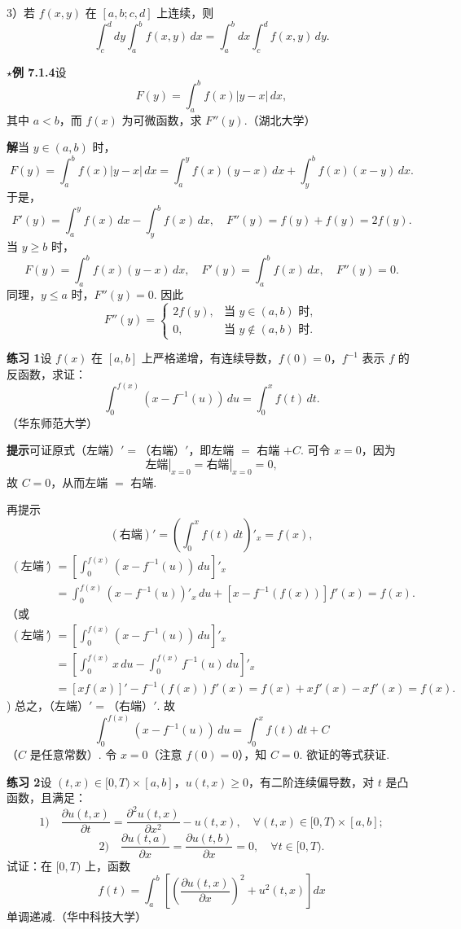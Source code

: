 \documentclass[UTF8,12pt,a4paper,fontset=fandol]{ctexart}
\begin{document}
3）若 $f(x,y)$ 在 $[a,b;c,d]$ 上连续，则
\[
\int_c^d dy\int_a^b f(x,y)\,dx
=\int_a^b dx\int_c^d f(x,y)\,dy.
\]

\noindent\textbf{$\star$例 7.1.4}\quad 设
\[
F(y)=\int_a^b f(x)|y-x|\,dx,
\]
其中 $a<b$，而 $f(x)$ 为可微函数，求 $F''(y)$.（湖北大学）

\noindent\textbf{解}\quad 当 $y\in(a,b)$ 时，
\[
F(y)=\int_a^b f(x)|y-x|\,dx
=\int_a^y f(x)(y-x)\,dx+\int_y^b f(x)(x-y)\,dx.
\]
于是，
\[
F'(y)=\int_a^y f(x)\,dx-\int_y^b f(x)\,dx,\quad
F''(y)=f(y)+f(y)=2f(y).
\]
当 $y\ge b$ 时，
\[
F(y)=\int_a^b f(x)(y-x)\,dx,\quad
F'(y)=\int_a^b f(x)\,dx,\quad F''(y)=0.
\]
同理，$y\le a$ 时，$F''(y)=0$. 因此
\[
F''(y)=
\begin{cases}
2f(y), & \text{当 }y\in(a,b)\text{ 时},\\
0, & \text{当 }y\notin(a,b)\text{ 时}.
\end{cases}
\]

\noindent\textbf{练习 1}\quad 设 $f(x)$ 在 $[a,b]$ 上严格递增，有连续导数，$f(0)=0$，$f^{-1}$ 表示 $f$ 的反函数，求证：
\[
\int_0^{f(x)}\left(x-f^{-1}(u)\right)\,du=\int_0^x f(t)\,dt.
\]
（华东师范大学）

\noindent\textbf{提示}\quad 可证原式（左端）$'=$（右端）$'$，即左端 $=$ 右端 $+C$. 可令 $x=0$，因为
\[
\left.\text{左端}\right|_{x=0}=\left.\text{右端}\right|_{x=0}=0,
\]
故 $C=0$，从而左端 $=$ 右端.

再提示
\[
\left(\text{右端}\right)'=\left(\int_0^x f(t)\,dt\right)'_x=f(x),
\]
\[
\begin{aligned}
\left(\text{左端}\right)'
&=\left[\int_0^{f(x)}\left(x-f^{-1}(u)\right)\,du\right]'_x\\
&=\int_0^{f(x)}\left(x-f^{-1}(u)\right)'_x\,du
+\left[x-f^{-1}(f(x))\right]f'(x)=f(x).
\end{aligned}
\]
（或
\[
\begin{aligned}
\left(\text{左端}\right)'
&=\left[\int_0^{f(x)}\left(x-f^{-1}(u)\right)\,du\right]'_x\\
&=\left[\int_0^{f(x)}x\,du-\int_0^{f(x)}f^{-1}(u)\,du\right]'_x\\
&=\left[xf(x)\right]'-f^{-1}(f(x))f'(x)
=f(x)+xf'(x)-xf'(x)=f(x).
\end{aligned}
\])
总之，（左端）$'=$（右端）$'$. 故
\[
\int_0^{f(x)}\left(x-f^{-1}(u)\right)\,du
=\int_0^x f(t)\,dt+C
\]
（$C$ 是任意常数）. 令 $x=0$（注意 $f(0)=0$），知 $C=0$. 欲证的等式获证.

\noindent\textbf{练习 2}\quad 设 $(t,x)\in[0,T)\times[a,b]$，$u(t,x)\ge0$，有二阶连续偏导数，对 $t$ 是凸函数，且满足：
\[
1)\quad \frac{\partial u(t,x)}{\partial t}
=\frac{\partial^2 u(t,x)}{\partial x^2}-u(t,x),
\quad \forall(t,x)\in[0,T)\times[a,b];
\]
\[
2)\quad
\frac{\partial u(t,a)}{\partial x}
=\frac{\partial u(t,b)}{\partial x}=0,\quad \forall t\in[0,T).
\]
试证：在 $[0,T)$ 上，函数
\[
f(t)=\int_a^b\left[\left(\frac{\partial u(t,x)}{\partial x}\right)^2+u^2(t,x)\right]dx
\]
单调递减.（华中科技大学）
\end{document}
